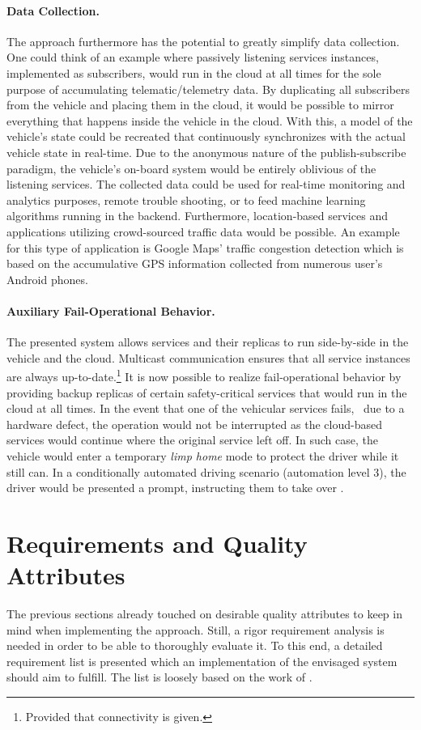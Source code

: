 \paragraph{Data Collection.}
The approach furthermore has the potential to greatly simplify data collection. One could think of an example where passively listening services instances, implemented as subscribers, would run in the cloud at all times for the sole purpose of accumulating telematic/telemetry data. By duplicating all subscribers from the vehicle and placing them in the cloud, it would be possible to mirror everything that happens inside the vehicle in the cloud. With this, a model of the vehicle's state could be recreated that continuously synchronizes with the actual vehicle state in real-time. Due to the anonymous nature of the publish-subscribe paradigm, the vehicle's on-board system would be entirely oblivious of the listening services. The collected data could be used for real-time monitoring and analytics purposes, remote trouble shooting, or to feed machine learning algorithms running in the backend. Furthermore, location-based services and applications utilizing crowd-sourced traffic data would be possible. An example for this type of application is Google Maps' traffic congestion detection which is based on the accumulative GPS information collected from numerous user's Android phones.

\paragraph{Auxiliary Fail-Operational Behavior.}
The presented system allows services and their replicas to run side-by-side in the vehicle and the cloud. Multicast communication ensures that all service instances are always up-to-date.\footnote{Provided that connectivity is given.} It is now possible to realize fail-operational behavior by providing backup replicas of certain safety-critical services that would run in the cloud at all times. In the event that one of the vehicular services fails, \eg\ due to a hardware defect, the operation would not be interrupted as the cloud-based services would continue where the original service left off. In such case, the vehicle would enter a temporary \emph{limp home} mode to protect the driver while it still can. In a conditionally automated driving scenario (automation level 3), the driver would be presented a prompt, instructing them to take over \cite{kugele2017service}.

%
%
%
%
%
%
%
%
%
%
\section{Requirements and Quality Attributes} \label{sec:requirements}
The previous sections already touched on desirable quality attributes to keep in mind when implementing the approach. Still, a rigor requirement analysis is needed in order to be able to thoroughly evaluate it. To this end, a detailed requirement list is presented which an implementation of the envisaged system should aim to fulfill. The list is loosely based on the work of \citeauthor*{o2007quality} \cite{o2007quality}.

